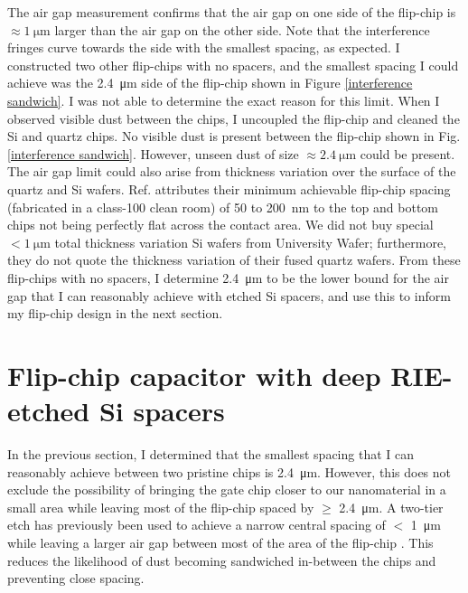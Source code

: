 \documentclass[double,12pt,1in]{beavtex}
\begin{document}
The air gap measurement confirms that the air gap on one side of the flip-chip is $\approx \SI{1}{\micro\meter}$ larger than the air gap on the other side. Note that the interference fringes curve towards the side with the smallest spacing, as expected. I constructed two other flip-chips with no spacers, and the smallest spacing I could achieve was the \SI{2.4}{\micro\meter} side of the flip-chip shown in Figure \ref{interference sandwich}. I was not able to determine the exact reason for this limit. When I observed visible dust between the chips, I uncoupled the flip-chip and cleaned the Si and quartz chips. No visible dust is present between the flip-chip shown in Fig. \ref{interference sandwich}. However, unseen dust of size $\approx \SI{2.4}{\micro\meter}$ could be present. The air gap limit could also arise from thickness variation over the surface of the quartz and Si wafers. Ref. \cite{bennaceur_mechanical_2015} attributes their minimum achievable flip-chip spacing (fabricated in a class-100 clean room) of 50 to \SI{200}{\nano\meter} to the top and bottom chips not being perfectly flat across the contact area. We did not buy special $< \SI{1}{\micro\meter}$ total thickness variation Si wafers from University Wafer; furthermore, they do not quote the thickness variation of their fused quartz wafers. From these flip-chips with no spacers, I determine \SI{2.4}{\micro\meter} to be the lower bound for the air gap that I can reasonably achieve with etched Si spacers, and use this to inform my flip-chip design in the next section.


\section{Flip-chip capacitor with deep RIE-etched Si spacers} \label{FC SIspacer}
In the previous section, I determined that the smallest spacing that I can reasonably achieve between two pristine chips is \SI{2.4}{\micro\meter}. However, this does not exclude the possibility of bringing the gate chip closer to our nanomaterial in a small area while leaving most of the flip-chip spaced by $\geq$ \SI{2.4}{\micro\meter}. A two-tier etch has previously been used to achieve a narrow central spacing of $<$ \SI{1}{\micro\meter} while leaving a larger air gap between most of the area of the flip-chip \cite{beukman_noninvasive_2015}. This reduces the likelihood of dust becoming sandwiched in-between the chips and preventing close spacing. 
\end{document}
